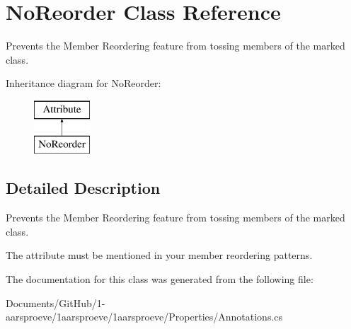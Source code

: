 \hypertarget{class_no_reorder}{}\section{No\+Reorder Class Reference}
\label{class_no_reorder}


Prevents the Member Reordering feature from tossing members of the marked class.  


Inheritance diagram for No\+Reorder\+:\begin{figure}[H]
\begin{center}
\leavevmode
\includegraphics[height=2.000000cm]{class_no_reorder}
\end{center}
\end{figure}


\subsection{Detailed Description}
Prevents the Member Reordering feature from tossing members of the marked class. 

The attribute must be mentioned in your member reordering patterns. 

The documentation for this class was generated from the following file\+:\begin{DoxyCompactItemize}
\item 
Documents/\+Git\+Hub/1-\/aarsproeve/1aarsproeve/1aarsproeve/\+Properties/Annotations.\+cs\end{DoxyCompactItemize}
